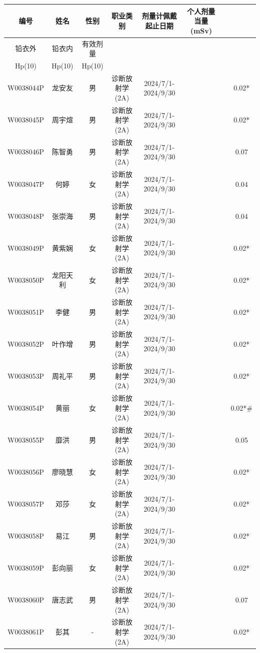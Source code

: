\begin{table}[H]
\centering
\begin{tabular}{|c|c|c|c|c|c|c|c|}
\hline
编号 & 姓名 & 性别 & 职业类别 & 剂量计佩戴起止日期 & 个人剂量当量(mSv) &  &  \\
\hline
铅衣外 & 铅衣内 & 有效剂量 &  &  &  &  &  \\
\hline
Hp(10) & Hp(10) & Hp(10) &  &  &  &  &  \\
\hline
W0038044P & 龙安友 & 男 & 诊断放射学(2A) & 2024/7/1-2024/9/30 &  &  & 0.02* \\
\hline
W0038045P & 周宇煊 & 男 & 诊断放射学(2A) & 2024/7/1-2024/9/30 &  &  & 0.02* \\
\hline
W0038046P & 陈智勇 & 男 & 诊断放射学(2A) & 2024/7/1-2024/9/30 &  &  & 0.07 \\
\hline
W0038047P & 何婷 & 女 & 诊断放射学(2A) & 2024/7/1-2024/9/30 &  &  & 0.04 \\
\hline
W0038048P & 张崇海 & 男 & 诊断放射学(2A) & 2024/7/1-2024/9/30 &  &  & 0.04 \\
\hline
W0038049P & 黄紫娴 & 女 & 诊断放射学(2A) & 2024/7/1-2024/9/30 &  &  & 0.02* \\
\hline
W0038050P & 龙阳天利 & 女 & 诊断放射学(2A) & 2024/7/1-2024/9/30 &  &  & 0.02* \\
\hline
W0038051P & 李健 & 男 & 诊断放射学(2A) & 2024/7/1-2024/9/30 &  &  & 0.02* \\
\hline
W0038052P & 叶作增 & 男 & 诊断放射学(2A) & 2024/7/1-2024/9/30 &  &  & 0.02* \\
\hline
W0038053P & 周礼平 & 男 & 诊断放射学(2A) & 2024/7/1-2024/9/30 &  &  & 0.02* \\
\hline
W0038054P & 黄丽 & 女 & 诊断放射学(2A) & 2024/7/1-2024/9/30 &  &  & 0.02*\# \\
\hline
W0038055P & 靡洪 & 男 & 诊断放射学(2A) & 2024/7/1-2024/9/30 &  &  & 0.05 \\
\hline
W0038056P & 廖晓慧 & 女 & 诊断放射学(2A) & 2024/7/1-2024/9/30 &  &  & 0.02* \\
\hline
W0038057P & 邓莎 & 女 & 诊断放射学(2A) & 2024/7/1-2024/9/30 &  &  & 0.02* \\
\hline
W0038058P & 易江 & 男 & 诊断放射学(2A) & 2024/7/1-2024/9/30 &  &  & 0.02* \\
\hline
W0038059P & 彭向丽 & 女 & 诊断放射学(2A) & 2024/7/1-2024/9/30 &  &  & 0.02* \\
\hline
W0038060P & 唐志武 & 男 & 诊断放射学(2A) & 2024/7/1-2024/9/30 &  &  & 0.07 \\
\hline
W0038061P & 彭其 & - & 诊断放射学(2A) & 2024/7/1-2024/9/30 &  &  & 0.02* \\

\end{tabular}
\end{table}
